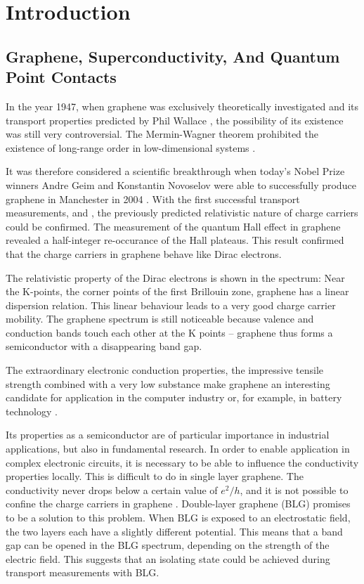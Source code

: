 \chapter{Introduction}
\label{ch:introduction}

\section*{Graphene, Superconductivity, And Quantum Point Contacts}
In the year 1947, when graphene was exclusively theoretically investigated and its transport properties predicted by Phil Wallace \cite{Wallace1947}, the possibility of its existence was still very controversial. The Mermin-Wagner theorem prohibited the existence of long-range order in low-dimensional systems \cite{Mermin1966}.

It was therefore considered a scientific breakthrough when today's Nobel Prize winners Andre Geim and Konstantin Novoselov were able to successfully produce graphene in Manchester in 2004 \cite{Novoselov2004}. With the first successful transport measurements, \cite{Zhang2005} and \cite{Novoselov2005}, the previously predicted relativistic nature of charge carriers \cite{Semenoff1984} could be confirmed. The measurement of the quantum Hall effect in graphene revealed a half-integer re-occurance of the Hall plateaus. This result confirmed that the charge carriers in graphene behave like Dirac electrons.

The relativistic property of the Dirac electrons is shown in the spectrum: Near the K-points, the corner points of the first Brillouin zone, graphene has a linear dispersion relation. This linear behaviour leads to a very good charge carrier mobility. The graphene spectrum is still noticeable because valence and conduction bands touch each other at the K points -- graphene thus forms a semiconductor with a disappearing band gap. 

The extraordinary electronic conduction properties, the impressive tensile strength combined with a very low substance make graphene an interesting candidate for application in the computer industry \cite{Jurewicz2014} or, for example, in battery technology \cite{Son2017}.

Its properties as a semiconductor are of particular importance in industrial applications, but also in fundamental research. In order to enable application in complex electronic circuits, it is necessary to be able to influence the conductivity properties locally. This is difficult to do in single layer graphene. The conductivity never drops below a certain value of $e^2/h$, and it is not possible to confine the charge carriers in graphene \cite{Katsnelson2006}. Double-layer graphene (BLG) promises to be a solution to this problem. When BLG is exposed to an electrostatic field, the two layers each have a slightly different potential. This means that a band gap can be opened in the BLG spectrum, depending on the strength of the electric field. This suggests that an isolating state could be achieved during transport measurements with BLG.

